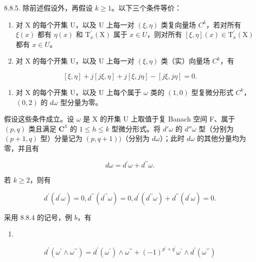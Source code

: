 8.8.5. 除前述假设外，再假设 \(k \geqslant 1\)。以下三个条件等价：

\begin{enumerate}
\def\labelenumi{(\roman{enumi})}
\item
  对 X 的每个开集 U，以及 U 上每一对 \((\xi, \eta)\) 类复向量场 \(C^{k}\)，若对所有 \(\xi(x)\) 都有 \(\eta(x)\) 和 \(\mathrm{T}_{x}^{\prime}(\mathrm{X})\) 属于 \(x \in U\)，则对所有 \([\xi, \eta](x) \in \mathrm{T}_{x}^{\prime}(\mathrm{X})\) 都有 \(x \in U\)。
\item
  对 X 的每个开集 U，以及 U 上每一对 \((\xi, \eta)\) 类（实）向量场 \(C^{k}\)，有
\end{enumerate}

\[
[ \xi , \eta ] + j [ j \xi , \eta ] + j [ \xi , j \eta ] - [ j \xi , j \eta ] = 0.
\]

\begin{enumerate}
\def\labelenumi{(\roman{enumi})}
\setcounter{enumi}{2}
\tightlist
\item
  对 X 的每个开集 U，以及 U 上每个属于 \(\omega\) 类的 \((1,0)\) 型复微分形式 \(C^{k}\)，\((0,2)\) 的 \(d\omega\) 型分量为零。
\end{enumerate}

假设这些条件成立。设 \(\omega\) 是 X 的开集 U 上取值于复 Banach 空间 F、属于 \((p,q)\) 类且满足 \(\mathbf{C}^h\) 的 \(1\leqslant h\leqslant k\) 型微分形式。将 \(d'\omega\) 的 \(d''\omega\) 型（分别为 \((p+1,q)\) 型）分量记为 \((p,q+1))\)（分别为 \(d\omega\)）；此时 \(d\omega\) 的其他分量均为零，并且有

\[
d \omega = d ^ {\prime} \omega + d ^ {\prime \prime} \omega .\tag{2}
\]

若 \(k\geqslant 2\)，则有

\[
d ^ {\prime} (d ^ {\prime} \omega) = 0, d ^ {\prime \prime} (d ^ {\prime \prime} \omega) = 0, d ^ {\prime} (d ^ {\prime \prime} \omega) + d ^ {\prime \prime} (d ^ {\prime} \omega) = 0.\tag{3}
\]

采用 8.8.4 的记号，例 \(b\)，有

\begin{enumerate}
\def\labelenumi{(\arabic{enumi})}
\setcounter{enumi}{3}
\tightlist
\item
\end{enumerate}

\[
d ^ {\prime} \left(\omega^ {\prime} \wedge \omega^ {\prime \prime}\right) = d ^ {\prime} \left(\omega^ {\prime}\right) \wedge \omega^ {\prime \prime} + (- 1) ^ {p ^ {\prime} + q ^ {\prime}} \omega^ {\prime} \wedge d ^ {\prime} \left(\omega^ {\prime \prime}\right)\tag{4}
\]

